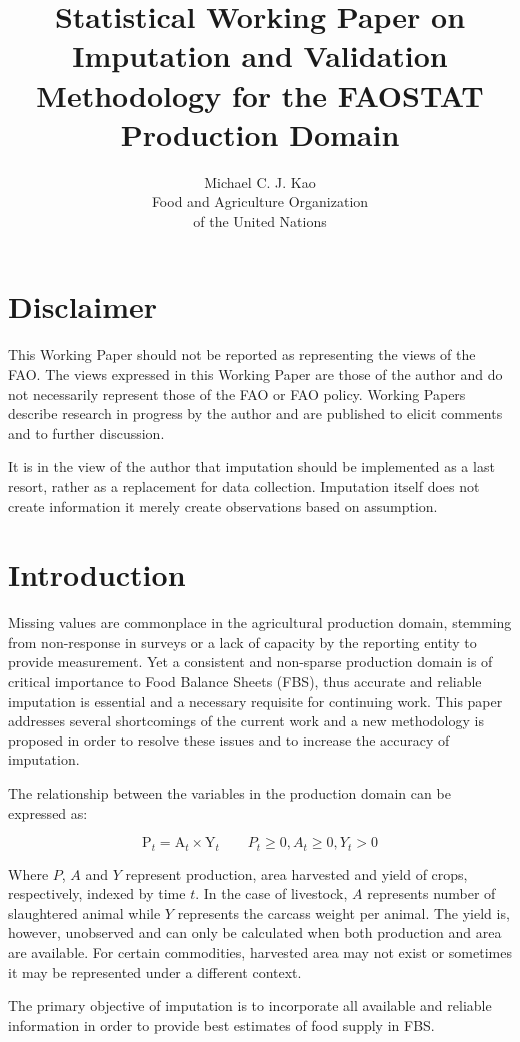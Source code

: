 \documentclass[nojss]{jss}\usepackage[]{graphicx}\usepackage[]{color}
\title{\bf Statistical Working Paper on Imputation and Validation
  Methodology for the FAOSTAT Production Domain}
\author{Michael C. J. Kao\\ Food and Agriculture Organization \\ of
  the United Nations}
\begin{document}
\section*{Disclaimer}
This Working Paper should not be reported as representing the views of
the FAO. The views expressed in this Working Paper are those of the
author and do not necessarily represent those of the FAO or FAO
policy. Working Papers describe research in progress by the author and
are published to elicit comments and to further discussion.

It is in the view of the author that imputation should be implemented
as a last resort, rather as a replacement for data
collection. Imputation itself does not create information it merely
create observations based on assumption. 

\section{Introduction}
Missing values are commonplace in the agricultural production domain,
stemming from non-response in surveys or a lack of capacity by the
reporting entity to provide measurement. Yet a consistent and
non-sparse production domain is of critical importance to Food Balance
Sheets (FBS), thus accurate and reliable imputation is essential and a
necessary requisite for continuing work. This paper addresses several
shortcomings of the current work and a new methodology is proposed in
order to resolve these issues and to increase the accuracy of
imputation.

The relationship between the variables in the production domain can be
expressed as:

\begin{equation}
  \label{eq:identity}
  \text{P}_t = \text{A}_t \times \text{Y}_t \quad\quad P_t \ge 0, A_t
  \ge 0, Y_t > 0
\end{equation}


Where $P$, $A$ and $Y$ represent production, area harvested and yield
of crops, respectively, indexed by time $t$. In the case of livestock,
$A$ represents number of slaughtered animal while $Y$ represents the
carcass weight per animal. The yield is, however, unobserved and can
only be calculated when both production and area are available. For
certain commodities, harvested area may not exist or sometimes it may
be represented under a different context.


The primary objective of imputation is to incorporate all
available and reliable information in order to provide best estimates of
food supply in FBS.
\end{document}
